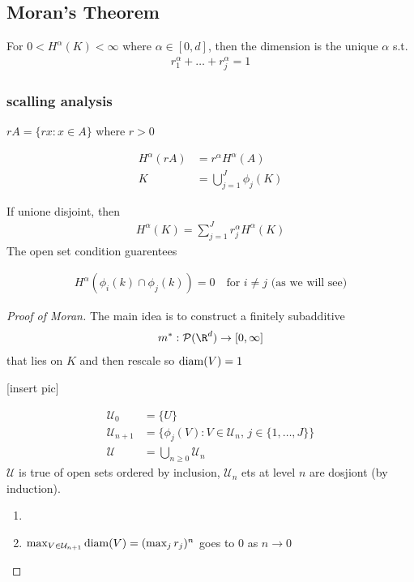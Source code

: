 \subsection{Moran's Theorem}

\begin{theorem}[Moran's 1946]

	For $0 < H^{\alpha} (K) < \infty$ where $\alpha \in [0,d]$, then the dimension is the unique $\alpha$ s.t.
	\begin{align*}
	r_{1}^{\alpha} + \ldots + r_{j}^{\alpha} = 1
	\end{align*} 
	
\end{theorem}


\subsubsection{scalling analysis}

$rA = \{rx : x \in A \}$ where  $r > 0$

 \begin{align*}
	 H^{\alpha} (rA) &= r^{\alpha} H^{\alpha} (A) \\
				K	&= \bigcup_{j=1}^{J} \phi_{j} (K)
\end{align*} 

If unione disjoint, then 
\begin{align*}
	H^{\alpha}(K) = \sum_{j=1}^{J} r_{j}^{\alpha} H^{\alpha} (K)
\end{align*} 
 The open set condition guarentees

 \begin{align*}
 	H^{\alpha} (\phi_{i} (k) \cap \phi_{j} (k) ) = 0 \quad \text{for $i \neq j$  (as we will see)}
 \end{align*} 

 \begin{proof}[Proof of Moran]
	 The main idea is to construct a finitely subadditive \\
	 \begin{align*}
		 m^{*} : \mathcal{P}(\R^{d}) \to [0, \infty]
	 \end{align*}
	 that lies on $K$ and then rescale so $\operatorname*{diam}(V) = 1$

	 [insert pic]

	 \begin{align*}
		 \mathcal{U}_0 &= \{U \} \\
		 \mathcal{U}_{n+1} &= \{\phi_{j} (V) : V \in \mathcal{U}_{n}, \, j \in \{1, \ldots , J \}\} \\
		 \mathcal{U} &= \bigcup_{n \geq 0} \mathcal{U}_{n}
	 \end{align*} 
$\mathcal{U}$ is true of open sets ordered by inclusion, $\mathcal{U}_{n}$ ets at level $n$ are dosjiont (by induction).

\begin{enumerate}
	\item 
	\item $\max_{V \in \mathcal{U}_{n+1}} \operatorname*{diam} (V) = (\max_{j} r_{j})^{n}$ goes to $0$ as $n \to 0$
\end{enumerate}

\end{proof}


